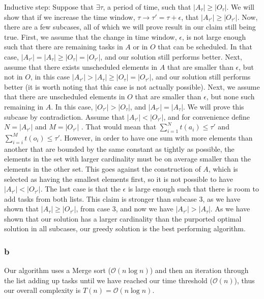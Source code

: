 \documentclass[11pt,letterpaper]{article}
\begin{document}
Inductive step: Suppose that $\exists \tau$, a period of time, such that $|A_{\tau}| \geq |O_{\tau}|$. We will show that if we increase the time window, $\tau \to \tau ' = \tau + \epsilon$, that $|A_{\tau'}| \geq |O_{\tau'}|$. Now, there are a few subcases, all of which we will prove result in our claim still being true. First, we assume that the change in time window, $\epsilon$, is not large enough such that there are remaining tasks in $A$ or in $O$ that can be scheduled. In that case, $|A_{\tau'}| = |A_{\tau }| \geq |O_{\tau}| = |O_{\tau'}|$, and our solution still performs better. Next, assume that there exists unscheduled elements in $A$ that are smaller than $\epsilon$, but not in $O$, in this case $|A_{\tau'}| > |A_{\tau }| \geq |O_{\tau}| = |O_{\tau'}|$, and our solution still performs better (it is worth noting that this case is not actually possible). Next, we assume that there are unscheduled elements in $O$ that are smaller than $\epsilon$, but none such remaining in $A$. In this case, $|O_{\tau'}| > |O_{\tau}|$, and $|A_{\tau'}| = |A_{\tau }|$. We will prove this subcase by contradiction. Assume that $|A_{\tau'}| < |O_{\tau'}|$, and for convenience define $N = |A_{\tau'}|$ and $M = |O_{\tau'}|$ . That would mean that $\sum_{i=1}^Nt(a_i) \leq \tau'$ and $\sum_{i=i}^{M}t(o_i) \leq \tau'$. However, in order to have one sum with more elements than another that are bounded by the same constant as tightly as possible, the elements in the set with larger cardinality must be on average smaller than the elements in the other set. This goes against the construction of $A$, which is selected as having the smallest elements first, so it is not possible to have $|A_{\tau'}| < |O_{\tau'}|$. The last case is that the $\epsilon$ is large enough such that there is room to add tasks from both lists. This claim is stronger than subcase 3, as we have shown that $|A_{\tau }| \geq |O_{\tau'}|$, from case 3, and now we have $|A_{\tau'}| > |A_{\tau}|$. As we have shown that our solution has a larger cardinality than the purported optimal solution in all subcases, our greedy solution is the best performing algorithm. 

\subsubsection*{b}
Our algorithm uses a Merge sort ($\mathcal{O}(n \log n)$) and then an iteration through the list adding up tasks until we have reached our time threshold ($\mathcal{O}(n)$), thus our overall complexity is $T(n) = \mathcal{O}(n \log n)$. 
\end{document}
